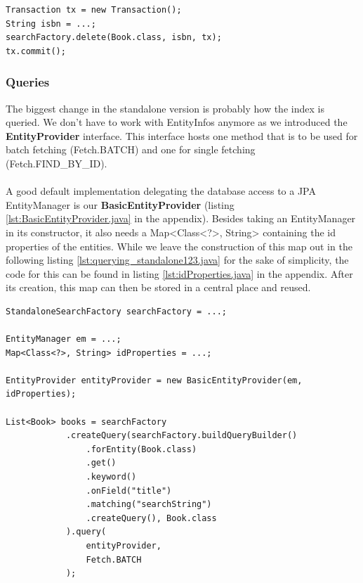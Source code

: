 \lstset{language=java}
\begin{lstlisting}[frame=htrbl, caption={Deleting an object by id with the standalone version}, label={lst:deleting_object_native.java}]
Transaction tx = new Transaction();
String isbn = ...;
searchFactory.delete(Book.class, isbn, tx);
tx.commit();
\end{lstlisting}

\pagebreak

\subsubsection{Queries} \label{querying_standalone}
The biggest change in the standalone version is probably how the index is queried. We don't have to work with EntityInfos anymore as we introduced the \textbf{EntityProvider} interface. This interface hosts one method that is to be used for batch fetching (Fetch.BATCH) and one for single fetching (Fetch.FIND\_BY\_ID).
\\\\
A good default implementation delegating the database access to a JPA EntityManager is our \textbf{BasicEntityProvider} (listing \ref{lst:BasicEntityProvider.java} in the appendix). Besides taking an EntityManager in its constructor, it also needs a Map<Class<?>, String> containing the id properties of the entities. While we leave the construction of this map out in the following listing \ref{lst:querying_standalone123.java} for the sake of simplicity, the code for this can be found in listing \ref{lst:idProperties.java} in the appendix. After its creation, this map can then be stored in a central place and reused.
\\
\lstset{language=java}
\begin{lstlisting}[frame=htrbl, caption={Querying the index with the standalone version}, label={lst:querying_standalone123.java}]
StandaloneSearchFactory searchFactory = ...;

EntityManager em = ...;
Map<Class<?>, String> idProperties = ...;

EntityProvider entityProvider = new BasicEntityProvider(em, idProperties);

List<Book> books = searchFactory
			.createQuery(searchFactory.buildQueryBuilder()
				.forEntity(Book.class)
				.get()
				.keyword()
				.onField("title")
				.matching("searchString")
				.createQuery(), Book.class
			).query(
				entityProvider,
				Fetch.BATCH
			);
\end{lstlisting}

